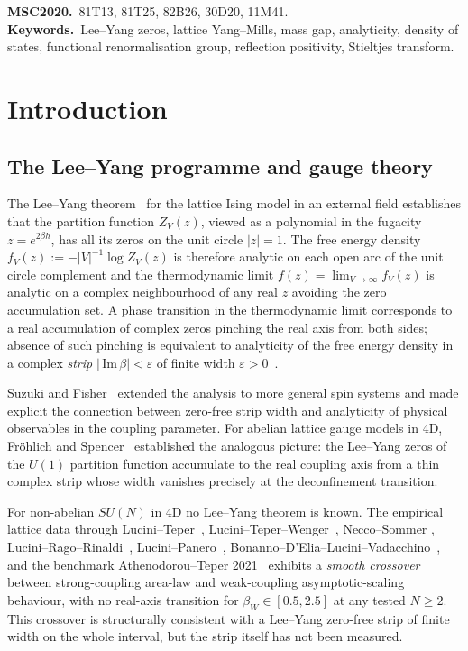 \documentclass[11pt,a4paper]{article}
\theoremstyle{definition}
\theoremstyle{remark}
\newcommand{\sgnIm}{\,\mathrm{Im}\,}
\begin{document}
\medskip
\noindent\textbf{MSC2020.}\ 81T13, 81T25, 82B26, 30D20, 11M41.\\
\textbf{Keywords.}\ Lee--Yang zeros, lattice Yang--Mills, mass gap,
analyticity, density of states, functional renormalisation group,
reflection positivity, Stieltjes transform.

\medskip

\section{Introduction}
\label{sec:intro}

\subsection{The Lee--Yang programme and gauge theory}

The Lee--Yang theorem~\cite{LeeYang1952} for the lattice Ising model
in an external field establishes that the partition function
$Z_V(z)$, viewed as a polynomial in the fugacity $z=e^{2\beta h}$,
has all its zeros on the unit circle $|z|=1$. The free energy
density $f_V(z) := -|V|^{-1} \log Z_V(z)$ is therefore analytic on
each open arc of the unit circle complement and the thermodynamic
limit $f(z) = \lim_{V\to\infty} f_V(z)$ is analytic on a complex
neighbourhood of any real $z$ avoiding the zero accumulation set.
A phase transition in the thermodynamic limit corresponds to a real
accumulation of complex zeros pinching the real axis from both
sides; absence of such pinching is equivalent to analyticity of the
free energy density in a complex \emph{strip}
$|\sgnIm \beta| < \varepsilon$ of finite width
$\varepsilon > 0$~\cite{Ruelle1969}.

Suzuki and Fisher~\cite{SuzukiFisher1971} extended the analysis to
more general spin systems and made explicit the connection between
zero-free strip width and analyticity of physical observables in
the coupling parameter. For abelian lattice gauge models in 4D,
Fr\"ohlich and Spencer~\cite{FroehlichSpencer1982} established the
analogous picture: the Lee--Yang zeros of the $U(1)$ partition
function accumulate to the real coupling axis from a thin complex
strip whose width vanishes precisely at the deconfinement
transition.

For non-abelian $SU(N)$ in 4D no Lee--Yang theorem is known. The
empirical lattice data through Lucini--Teper~\cite{LuciniTeper2001},
Lucini--Teper--Wenger~\cite{LuciniTeperWenger2004}, Necco--Sommer
\cite{NeccoSommer2001}, Lucini--Rago--Rinaldi~\cite{LuciniRagoRinaldi2010},
Lucini--Panero~\cite{LuciniPanero2012},
Bonanno--D'Elia--Lucini--Vadacchino~\cite{BDLV2022}, and the
benchmark Athenodorou--Teper 2021~\cite{AthenodorouTeper2021}
exhibits a \emph{smooth crossover} between strong-coupling area-law
and weak-coupling asymptotic-scaling behaviour, with no real-axis
transition for $\beta_W \in [0.5, 2.5]$ at any tested $N \ge 2$.
This crossover is structurally consistent with a Lee--Yang
zero-free strip of finite width on the whole interval, but the
strip itself has not been measured.
\end{document}
